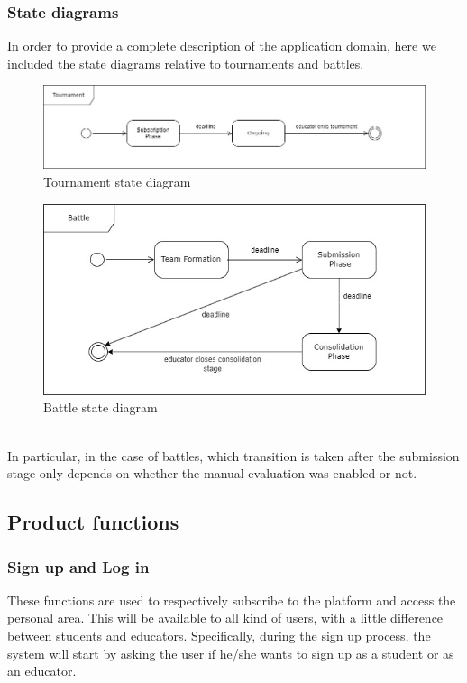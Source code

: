 \subsubsection{ State diagrams}
In order to provide a complete description of the application domain, here we included the state diagrams relative to tournaments and battles.
\begin{figure}[h]
    \hspace{-20px}
    \includegraphics[scale=0.5]{Diagrams/tournament_state.jpg}
    \caption{Tournament state diagram}
    \label{tournament_state}
\end{figure}
\begin{figure}[h]
    \hspace{20px}
    \includegraphics[scale=0.55]{Diagrams/battle_state.jpg}
    \caption{Battle state diagram}
    \label{battle_state}
\end{figure}
\\In particular, in the case of battles, which transition is taken after the submission stage only depends on whether the manual evaluation was enabled or not.

\subsection{Product functions}
\subsubsection{Sign up and Log in}
These functions are used to respectively subscribe to the platform and access the personal area. This will be available to all kind of users, with a little difference between students and educators. Specifically, during the sign up process, the system will start by asking the user if he/she wants to sign up as a student or as an educator.

